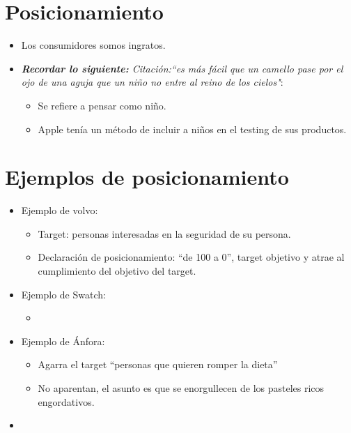 \section{Posicionamiento}
\begin{itemize}
    \item Los consumidores somos ingratos.
    \item \emph{\textbf{Recordar lo siguiente: }\emph{Citación:``es más fácil que un camello pase por el ojo de una aguja que un niño no entre al reino de los cielos"}}:
        \begin{itemize}
            \item Se refiere a pensar como niño.
            \item Apple tenía un método de incluir a niños en el testing de sus productos.
        \end{itemize}
    
\end{itemize}


\section{Ejemplos de posicionamiento}
\begin{itemize}
    \item Ejemplo de volvo:
        \begin{itemize}
            \item Target: personas interesadas en la seguridad de su persona.
            \item Declaración de posicionamiento: ``de 100 a 0'', target objetivo y atrae al cumplimiento del objetivo del target. 
        \end{itemize}
    
    \item Ejemplo de Swatch:
        \begin{itemize}
            \item 
        \end{itemize}
    
    \item Ejemplo de Ánfora:
        \begin{itemize}
            \item Agarra el target ``personas que quieren romper la dieta''
            \item No aparentan, el asunto es que se enorgullecen de los pasteles ricos engordativos.
        \end{itemize}
    
    \item 
\end{itemize}
